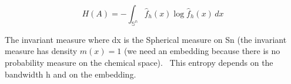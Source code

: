 \[ H(A) = -\int_\mathbb{{S}^n}  \hat{f}_h(x)\log  \hat{f}_h(x) \,dx  \]



The invariant measure where dx is the Spherical measure on Sn (the invariant measure has density $m(x)=1$ (we need an embedding because there is no probability measure on the chemical space). 
This entropy depends on the bandwidth h and on the embedding.
